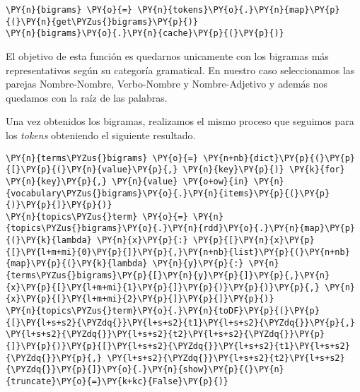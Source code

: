 \begin{tcolorbox}[breakable, size=fbox, boxrule=1pt, pad at break*=1mm,colback=cellbackground, colframe=cellborder]
\begin{Verbatim}[commandchars=\\\{\}]
\PY{n}{bigrams} \PY{o}{=} \PY{n}{tokens}\PY{o}{.}\PY{n}{map}\PY{p}{(}\PY{n}{get\PYZus{}bigrams}\PY{p}{)}	
\PY{n}{bigrams}\PY{o}{.}\PY{n}{cache}\PY{p}{(}\PY{p}{)}
\end{Verbatim}
\end{tcolorbox}


El objetivo de esta función es quedarnos unicamente con los bigramas más representativos según su categoría gramatical. En nuestro caso seleccionamos las parejas Nombre-Nombre, Verbo-Nombre y Nombre-Adjetivo y además nos quedamos con la raíz de las palabras.
          
Una vez obtenidos los bigramas, realizamos el mismo proceso que seguimos para los \textit{tokens} obteniendo el siguiente resultado.

\vspace{0.5cm}
   \begin{tcolorbox}[breakable, size=fbox, boxrule=1pt, pad at break*=1mm,colback=cellbackground, colframe=cellborder]
\begin{Verbatim}[commandchars=\\\{\}]
\PY{n}{terms\PYZus{}bigrams} \PY{o}{=} \PY{n+nb}{dict}\PY{p}{(}\PY{p}{[}\PY{p}{(}\PY{n}{value}\PY{p}{,} \PY{n}{key}\PY{p}{)} \PY{k}{for} \PY{n}{key}\PY{p}{,} \PY{n}{value} \PY{o+ow}{in} \PY{n}{vocabulary\PYZus{}bigrams}\PY{o}{.}\PY{n}{items}\PY{p}{(}\PY{p}{)}\PY{p}{]}\PY{p}{)}
\PY{n}{topics\PYZus{}term} \PY{o}{=} \PY{n}{topics\PYZus{}bigrams}\PY{o}{.}\PY{n}{rdd}\PY{o}{.}\PY{n}{map}\PY{p}{(}\PY{k}{lambda} \PY{n}{x}\PY{p}{:} \PY{p}{[}\PY{n}{x}\PY{p}{[}\PY{l+m+mi}{0}\PY{p}{]}\PY{p}{,}\PY{n+nb}{list}\PY{p}{(}\PY{n+nb}{map}\PY{p}{(}\PY{k}{lambda} \PY{n}{y}\PY{p}{:} \PY{n}{terms\PYZus{}bigrams}\PY{p}{[}\PY{n}{y}\PY{p}{]}\PY{p}{,}\PY{n}{x}\PY{p}{[}\PY{l+m+mi}{1}\PY{p}{]}\PY{p}{)}\PY{p}{)}\PY{p}{,} \PY{n}{x}\PY{p}{[}\PY{l+m+mi}{2}\PY{p}{]}\PY{p}{]}\PY{p}{)}
\PY{n}{topics\PYZus{}term}\PY{o}{.}\PY{n}{toDF}\PY{p}{(}\PY{p}{[}\PY{l+s+s2}{\PYZdq{}}\PY{l+s+s2}{t1}\PY{l+s+s2}{\PYZdq{}}\PY{p}{,} \PY{l+s+s2}{\PYZdq{}}\PY{l+s+s2}{t2}\PY{l+s+s2}{\PYZdq{}}\PY{p}{]}\PY{p}{)}\PY{p}{[}\PY{l+s+s2}{\PYZdq{}}\PY{l+s+s2}{t1}\PY{l+s+s2}{\PYZdq{}}\PY{p}{,} \PY{l+s+s2}{\PYZdq{}}\PY{l+s+s2}{t2}\PY{l+s+s2}{\PYZdq{}}\PY{p}{]}\PY{o}{.}\PY{n}{show}\PY{p}{(}\PY{n}{truncate}\PY{o}{=}\PY{k+kc}{False}\PY{p}{)}
\end{Verbatim}
\end{tcolorbox}

